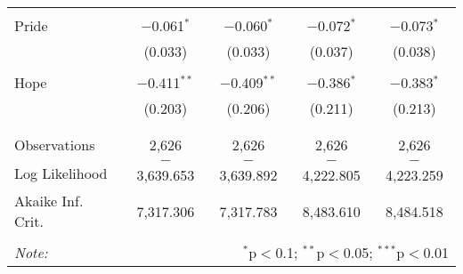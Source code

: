 \begin{table}[!htbp]
\begin{tabular}{@{\extracolsep{5pt}}lcccc}
  & & & & \\ 
 Pride & $-$0.061$^{*}$ & $-$0.060$^{*}$ & $-$0.072$^{*}$ & $-$0.073$^{*}$ \\ 
  & (0.033) & (0.033) & (0.037) & (0.038) \\ 
  & & & & \\ 
 Hope & $-$0.411$^{**}$ & $-$0.409$^{**}$ & $-$0.386$^{*}$ & $-$0.383$^{*}$ \\ 
  & (0.203) & (0.206) & (0.211) & (0.213) \\ 
  & & & & \\ 
\hline \\[-1.8ex] 
Observations & 2,626 & 2,626 & 2,626 & 2,626 \\ 
Log Likelihood & $-$3,639.653 & $-$3,639.892 & $-$4,222.805 & $-$4,223.259 \\ 
Akaike Inf. Crit. & 7,317.306 & 7,317.783 & 8,483.610 & 8,484.518 \\ 
\hline 
\hline \\[-1.8ex] 
\textit{Note:}  & \multicolumn{4}{r}{$^{*}$p$<$0.1; $^{**}$p$<$0.05; $^{***}$p$<$0.01} \\ 
\end{tabular} 
\end{table} 
